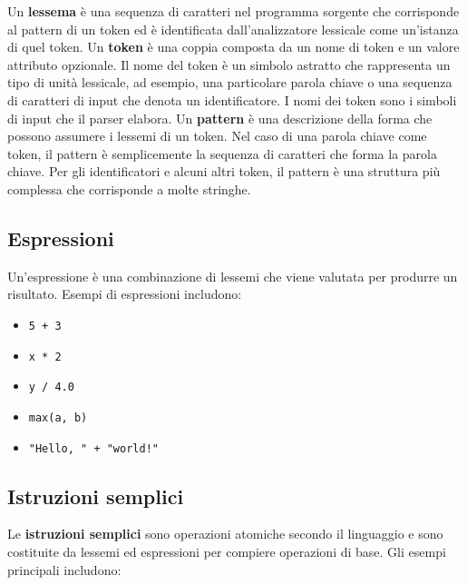 \documentclass[
  letterpaper,
]{scrbook}
\providecommand{\tightlist}{%
  \setlength{\itemsep}{0pt}\setlength{\parskip}{0pt}}\usepackage{longtable,booktabs,array}
\begin{document}
Un \textbf{lessema} è una sequenza di caratteri nel programma sorgente
che corrisponde al pattern di un token ed è identificata
dall'analizzatore lessicale come un'istanza di quel token. Un
\textbf{token} è una coppia composta da un nome di token e un valore
attributo opzionale. Il nome del token è un simbolo astratto che
rappresenta un tipo di unità lessicale, ad esempio, una particolare
parola chiave o una sequenza di caratteri di input che denota un
identificatore. I nomi dei token sono i simboli di input che il parser
elabora. Un \textbf{pattern} è una descrizione della forma che possono
assumere i lessemi di un token. Nel caso di una parola chiave come
token, il pattern è semplicemente la sequenza di caratteri che forma la
parola chiave. Per gli identificatori e alcuni altri token, il pattern è
una struttura più complessa che corrisponde a molte stringhe.

\subsection{Espressioni}\label{espressioni}

Un'espressione è una combinazione di lessemi che viene valutata per
produrre un risultato. Esempi di espressioni includono:

\begin{itemize}
\tightlist
\item
  \texttt{5\ +\ 3}
\item
  \texttt{x\ *\ 2}
\item
  \texttt{y\ /\ 4.0}
\item
  \texttt{max(a,\ b)}
\item
  \texttt{"Hello,\ "\ +\ "world!"}
\end{itemize}

\subsection{Istruzioni semplici}\label{istruzioni-semplici}

Le \textbf{istruzioni semplici} sono operazioni atomiche secondo il
linguaggio e sono costituite da lessemi ed espressioni per compiere
operazioni di base. Gli esempi principali includono:
\end{document}
